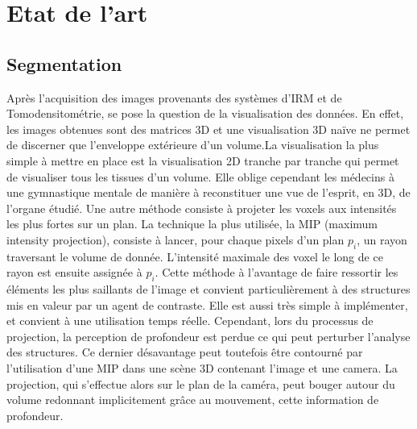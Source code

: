 %
\chapter{Etat de l'art}



\section{Segmentation}
\label{sec:EA:segmentation}


Après l'acquisition des images provenants des systèmes d'IRM et de Tomodensitométrie, se pose la question de la visualisation des données. En effet, les images obtenues sont des matrices 3D et une visualisation 3D naïve ne permet de discerner que l'enveloppe extérieure d'un volume.La visualisation la plus simple à mettre en place est la visualisation 2D tranche par tranche qui permet de visualiser tous les tissues d'un volume. Elle oblige cependant les médecins à une gymnastique mentale de manière à reconstituer une vue de l'esprit, en 3D, de l'organe étudié. Une autre méthode consiste à projeter les voxels aux intensités les plus fortes sur un plan. La technique la plus utilisée, la MIP (maximum intensity projection), consiste à lancer, pour chaque pixels d'un plan $p_i$, un rayon traversant le volume de donnée. L'intensité maximale des voxel le long de ce rayon est ensuite assignée à $p_i$. Cette méthode à l'avantage de faire ressortir les éléments les plus saillants de l'image et convient particulièrement à des structures mis en valeur par un agent de contraste. Elle est aussi très simple à implémenter, et convient à une utilisation temps réelle. Cependant, lors du processus de projection, la perception de profondeur est perdue ce qui peut perturber l'analyse des structures. Ce dernier désavantage peut toutefois être contourné par l'utilisation d'une MIP dans une scène 3D contenant l'image et une camera. La projection, qui s'effectue alors sur le plan de la caméra, peut bouger autour du volume redonnant implicitement grâce au mouvement, cette information de profondeur.

